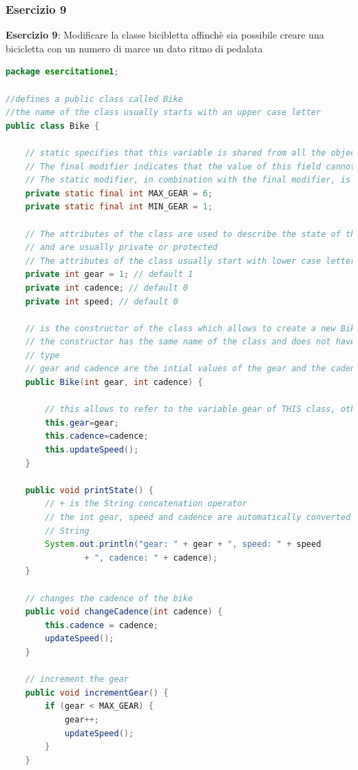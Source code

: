 \documentclass{article}
\theoremstyle{definition}
\begin{document}
\subsubsection{Esercizio 9}
\begin{framed}
\textbf{Esercizio 9}: Modificare la classe bicibletta affinch\`e sia possibile creare una bicicletta con un numero di marce  un dato ritmo di pedalata
\end{framed}

\begin{lstlisting}[language=Java,escapechar=|]
package esercitatione1;

//defines a public class called Bike 
//the name of the class usually starts with an upper case letter
public class Bike {

	// static specifies that this variable is shared from all the objects
	// The final modifier indicates that the value of this field cannot change.
 	// The static modifier, in combination with the final modifier, is also used to define constants. 
	private static final int MAX_GEAR = 6;
	private static final int MIN_GEAR = 1;

	// The attributes of the class are used to describe the state of the class
	// and are usually private or protected
	// The attributes of the class usually start with lower case letters
	private int gear = 1; // default 1
	private int cadence; // default 0
	private int speed; // default 0

	// is the constructor of the class which allows to create a new Bike
	// the constructor has the same name of the class and does not have a return
	// type
	// gear and cadence are the intial values of the gear and the cadence
	public Bike(int gear, int cadence) {
		
		// this allows to refer to the variable gear of THIS class, otherwise gear refers to the variable passed as parameter
		this.gear=gear;
		this.cadence=cadence;
		this.updateSpeed();
	}

	public void printState() {
		// + is the String concatenation operator
		// the int gear, speed and cadence are automatically converted into
		// String
		System.out.println("gear: " + gear + ", speed: " + speed
				+ ", cadence: " + cadence);
	}

	// changes the cadence of the bike
	public void changeCadence(int cadence) {
		this.cadence = cadence;
		updateSpeed();
	}

	// increment the gear
	public void incrementGear() {
		if (gear < MAX_GEAR) {
			gear++;
			updateSpeed();
		}
	}


\end{lstlisting}
\end{document}
